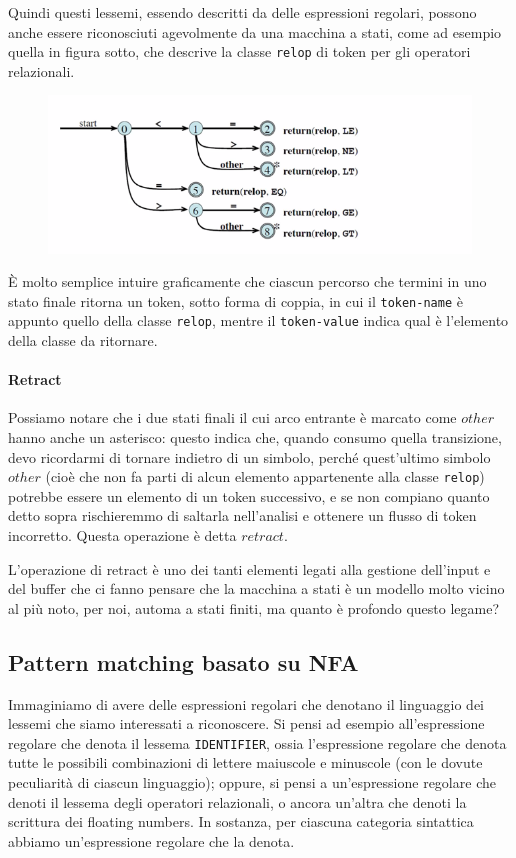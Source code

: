 \documentclass[class=book, crop=false, oneside, 12pt]{standalone}
\begin{document}
Quindi questi lessemi, essendo descritti da delle espressioni regolari, possono anche essere riconosciuti agevolmente da una macchina a stati, come ad esempio quella in figura sotto, che descrive la classe \texttt{relop} di token per gli operatori relazionali.
\begin{figure}[H]
    \centering
    \includegraphics[width=\textwidth,keepaspectratio]{lec-14-1}
    \caption{}
\end{figure}
È molto semplice intuire graficamente che ciascun percorso che termini in uno stato finale ritorna un token, sotto forma di coppia, in cui il \texttt{token-name} è appunto quello della classe \texttt{relop}, mentre il \texttt{token-value} indica qual è l'elemento della classe da ritornare.

\paragraph{Retract}
Possiamo notare che i due stati finali il cui arco entrante è marcato come \(other\) hanno anche un asterisco: questo indica che, quando consumo quella transizione, devo ricordarmi di tornare indietro di un simbolo, perché quest'ultimo simbolo \(other\) (cioè che non fa parti di alcun elemento appartenente alla classe \texttt{relop}) potrebbe essere un elemento di un token successivo, e se non compiano quanto detto sopra rischieremmo di saltarla nell'analisi e ottenere un flusso di token incorretto. Questa operazione è detta \(retract\).

L'operazione di retract è uno dei tanti elementi legati alla gestione dell'input e del buffer che ci fanno pensare che la macchina a stati è un modello molto vicino al più noto, per noi, automa a stati finiti, ma quanto è profondo questo legame?

\subsection{Pattern matching basato su NFA}
Immaginiamo di avere delle espressioni regolari che denotano il linguaggio dei lessemi che siamo interessati a riconoscere. Si pensi ad esempio all'espressione regolare che denota il lessema \texttt{IDENTIFIER}, ossia l'espressione regolare che denota tutte le possibili combinazioni di lettere maiuscole e minuscole (con le dovute peculiarità di ciascun linguaggio); oppure, si pensi a un'espressione regolare che denoti il lessema degli operatori relazionali, o ancora un'altra che denoti la scrittura dei floating numbers. In sostanza, per ciascuna categoria sintattica abbiamo un'espressione regolare che la denota.
\end{document}

